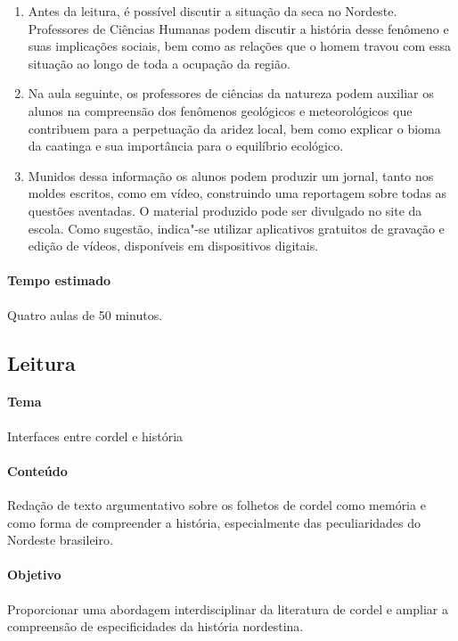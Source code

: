 \documentclass[12pt]{extarticle}
\begin{document}
\begin{enumerate}

\item Antes da leitura, é possível discutir a situação da seca no Nordeste.
  Professores de Ciências Humanas podem discutir a história desse fenômeno
  e suas implicações sociais, bem como as relações que o homem travou com essa
  situação ao longo de toda a ocupação da região.

\item Na aula seguinte, os professores de ciências da natureza podem auxiliar
  os alunos na compreensão dos fenômenos geológicos e meteorológicos que
  contribuem para a perpetuação da aridez local, bem como explicar o bioma da
  caatinga e sua importância para o equilíbrio ecológico. 

\item Munidos dessa informação os alunos podem produzir um jornal, tanto nos
  moldes escritos, como em vídeo, construindo uma reportagem sobre todas as
  questões aventadas. O material produzido pode ser divulgado no site da
  escola. Como sugestão, indica"-se utilizar aplicativos gratuitos de gravação
  e edição de vídeos, disponíveis em dispositivos digitais.

\end{enumerate}

\paragraph{Tempo estimado} Quatro aulas de 50 minutos.

\subsection{Leitura}

\paragraph{Tema} Interfaces entre cordel e história

\paragraph{Conteúdo} Redação de texto argumentativo sobre os folhetos de cordel
como memória e como forma de compreender a história, especialmente das
peculiaridades do Nordeste brasileiro.

\paragraph{Objetivo} Proporcionar uma abordagem interdisciplinar da literatura
de cordel e ampliar a compreensão de especificidades da história nordestina.
\end{document}

